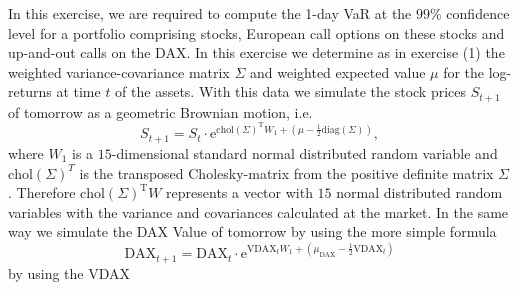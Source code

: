\documentclass[10pt,a4paper]{article}
\theoremstyle{definition}
\begin{document}
		In this exercise, we are required to compute the 1-day VaR at the $99\%$ 		confidence level for a portfolio comprising stocks, European call options on these stocks and up-and-out calls on the DAX. In this exercise we determine as in exercise (1) the weighted variance-covariance matrix $\Sigma$ and weighted expected value $\mu$ for the log-returns at time $t$ of the assets. With this data we simulate the stock prices $S_{t+1}$ of tomorrow as
		a geometric Brownian motion, i.e.
		\[
			S_{t+1}=S_t\cdot \mathrm{e}^{\mathrm{chol}(\Sigma)^\mathrm{T} W_1+\left(\mu-\frac12 
			\mathrm{diag}(\Sigma)\right)},
		\]
		where $W_1$ is a $15$-dimensional standard normal distributed random variable
and $\mathrm{chol}(\Sigma)^T$ is the transposed Cholesky-matrix from the positive definite matrix $\Sigma$. Therefore $\mathrm{chol}(\Sigma)^\mathrm{T} W$ represents a vector with $15$ normal distributed random variables with the variance and covariances calculated at the market.  
In the same way we simulate the DAX Value of tomorrow by using the more simple formula
\[
	\mathrm{DAX}_{t+1}=	\mathrm{DAX}_{t}\cdot \mathrm{e}^{\mathrm{VDAX}_t W_1+\left(\mu_{\mathrm{DAX}}-\frac12 
			\mathrm{VDAX}_t\right)}
\]
by using the VDAX
\end{document}
